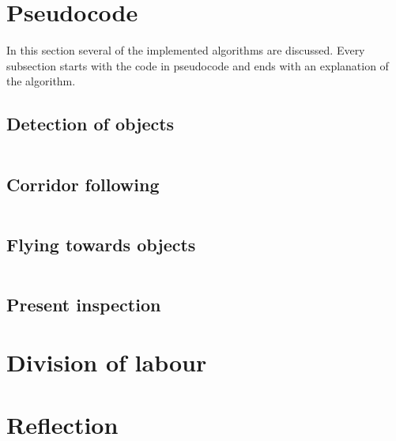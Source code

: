 \documentclass[a4paper,10pt]{article}
\begin{document}


\section{Pseudocode}
In this section several of the implemented algorithms are discussed. Every subsection starts with the code in pseudocode and ends with an explanation of the algorithm. 
\subsection{Detection of objects}
\begin{verbatim}

\end{verbatim}
\subsection{Corridor following} 
\begin{verbatim}

\end{verbatim}
\subsection{Flying towards objects}
\begin{verbatim}

\end{verbatim}
\subsection{Present inspection}

\section{Division of labour}
 
 

\section{Reflection}













\end{document}
